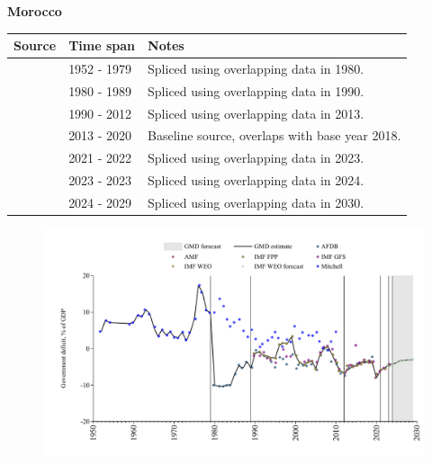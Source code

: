 \documentclass[12pt,a4paper,landscape]{article}
\begin{document}
\begin{adjustbox}{max totalsize={\paperwidth}{\paperheight},center}
\begin{minipage}[t][\textheight][t]{\textwidth}
\vspace*{0.5cm}
{}
\begin{center}
{\Large\bfseries Morocco}
\end{center}
\vspace{0.5cm}
\begin{table}[H]
\centering
\small
\begin{tabular}{|l|l|l|}
\hline
\textbf{Source} & \textbf{Time span} & \textbf{Notes} \\
\hline
\rowcolor{white}\cite{Mitchell}& 1952 - 1979 &Spliced using overlapping data in 1980.\\
\rowcolor{lightgray}\cite{AFDB}& 1980 - 1989 &Spliced using overlapping data in 1990.\\
\rowcolor{white}\cite{IMF_WEO}& 1990 - 2012 &Spliced using overlapping data in 2013.\\
\rowcolor{lightgray}\cite{AMF}& 2013 - 2020 &Baseline source, overlaps with base year 2018.\\
\rowcolor{white}\cite{IMF_WEO}& 2021 - 2022 &Spliced using overlapping data in 2023.\\
\rowcolor{lightgray}\cite{IMF_GFS}& 2023 - 2023 &Spliced using overlapping data in 2024.\\
\rowcolor{white}\cite{IMF_WEO_forecast}& 2024 - 2029 &Spliced using overlapping data in 2030.\\
\hline
\end{tabular}
\end{table}
\begin{figure}[H]
\centering
\includegraphics[width=\textwidth,height=0.6\textheight,keepaspectratio]{graphs/MAR_govdef_GDP.pdf}
\end{figure}
\end{minipage}
\end{adjustbox}
\end{document}
